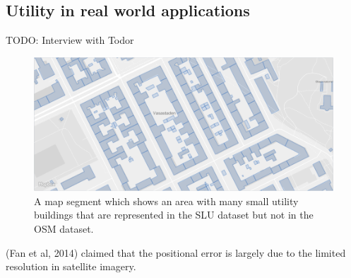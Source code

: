 \documentclass[a4paper]{article}
\begin{document}
\subsection{Utility in real world applications}

TODO: Interview with Todor


\begin{figure}[H]
    \centering
    \includegraphics[width=\textwidth,height=0.5\textheight,keepaspectratio]{img_map_utility_buildings}
    \caption{A map segment which shows an area with many small utility buildings that are represented in the SLU dataset but not in the OSM dataset.}
    \label{fig:space}
\end{figure}

(Fan et al, 2014) claimed that the positional error is largely due to the limited resolution in satellite imagery.
\end{document}
